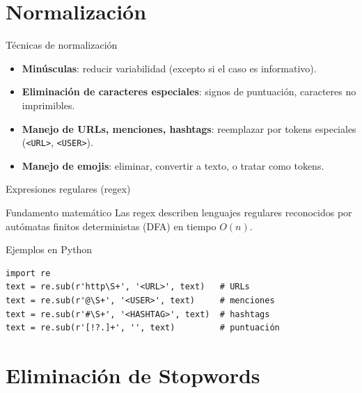\documentclass[aspectratio=169, 10pt, xcolor=table]{beamer}
\begin{document}
\section{Normalización}

\begin{frame}{Técnicas de normalización}
    \begin{itemize}
        \item \textbf{Minúsculas}: reducir variabilidad (excepto si el caso es informativo).
        \item \textbf{Eliminación de caracteres especiales}: signos de puntuación, caracteres no imprimibles.
        \item \textbf{Manejo de URLs, menciones, hashtags}: reemplazar por tokens especiales (\texttt{<URL>}, \texttt{<USER>}).
        \item \textbf{Manejo de emojis}: eliminar, convertir a texto, o tratar como tokens.
    \end{itemize}
\end{frame}

\begin{frame}[fragile]{Expresiones regulares (regex)}
    \begin{block}{Fundamento matemático}
        Las regex describen lenguajes regulares reconocidos por autómatas finitos deterministas (DFA) en tiempo $O(n)$.
    \end{block}
    \begin{exampleblock}{Ejemplos en Python}
        \begin{lstlisting}
import re
text = re.sub(r'http\S+', '<URL>', text)   # URLs
text = re.sub(r'@\S+', '<USER>', text)     # menciones
text = re.sub(r'#\S+', '<HASHTAG>', text)  # hashtags
text = re.sub(r'[!?.]+', '', text)         # puntuación
        \end{lstlisting}
    \end{exampleblock}
\end{frame}

\section{Eliminación de Stopwords}
\end{document}
